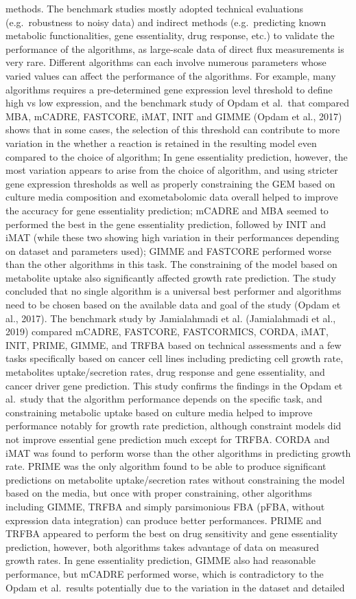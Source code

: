 \documentclass[12pt,twoside,openany,\mydriver]{thesis}  %
\begin{document}
methods. The benchmark studies mostly adopted technical evaluations (e.g.~robustness to noisy data) and indirect methods (e.g.~predicting known metabolic functionalities, gene essentiality, drug response, etc.) to validate the performance of the algorithms, as large-scale data of direct flux measurements is very rare. Different algorithms can each involve numerous parameters whose varied values can affect the performance of the algorithms. For example, many algorithms requires a pre-determined gene expression level threshold to define high vs low expression, and the benchmark study of Opdam et al.~that compared MBA, mCADRE, FASTCORE, iMAT, INIT and GIMME (Opdam et al., 2017) shows that in some cases, the selection of this threshold can contribute to more variation in the whether a reaction is retained in the resulting model even compared to the choice of algorithm; In gene essentiality prediction, however, the most variation appears to arise from the choice of algorithm, and using stricter gene expression thresholds as well as properly constraining the GEM based on culture media composition and exometabolomic data overall helped to improve the accuracy for gene essentiality prediction; mCADRE and MBA seemed to performed the best in the gene essentiality prediction, followed by INIT and iMAT (while these two showing high variation in their performances depending on dataset and parameters used); GIMME and FASTCORE performed worse than the other algorithms in this task. The constraining of the model based on metabolite uptake also significantly affected growth rate prediction. The study concluded that no single algorithm is a universal best performer and algorithms need to be chosen based on the available data and goal of the study (Opdam et al., 2017). The benchmark study by Jamialahmadi et al. (Jamialahmadi et al., 2019) compared mCADRE, FASTCORE, FASTCORMICS, CORDA, iMAT, INIT, PRIME, GIMME, and TRFBA based on technical assessments and a few tasks specifically based on cancer cell lines including predicting cell growth rate, metabolites uptake/secretion rates, drug response and gene essentiality, and cancer driver gene prediction. This study confirms the findings in the Opdam et al.~study that the algorithm performance depends on the specific task, and constraining metabolic uptake based on culture media helped to improve performance notably for growth rate prediction, although constraint models did not improve essential gene prediction much except for TRFBA. CORDA and iMAT was found to perform worse than the other algorithms in predicting growth rate. PRIME was the only algorithm found to be able to produce significant predictions on metabolite uptake/secretion rates without constraining the model based on the media, but once with proper constraining, other algorithms including GIMME, TRFBA and simply parsimonious FBA (pFBA, without expression data integration) can produce better performances. PRIME and TRFBA appeared to perform the best on drug sensitivity and gene essentiality prediction, however, both algorithms takes advantage of data on measured growth rates. In gene essentiality prediction, GIMME also had reasonable performance, but mCADRE performed worse, which is contradictory to the Opdam et al.~results potentially due to the variation in the dataset and detailed 
\end{document}
